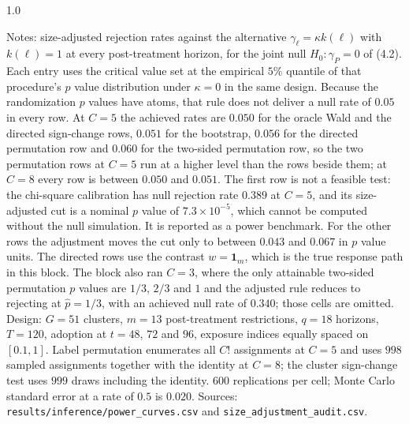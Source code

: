 \documentclass[12pt]{article}
\theoremstyle{definition}
\numberwithin{equation}{section}
\begin{document}
\begin{table}[htbp]
\begin{spacing}{1.0}
\smallskip
\begin{minipage}{0.95\textwidth}
\footnotesize Notes: size-adjusted rejection rates against the alternative
$\gamma_\ell = \kappa k(\ell)$ with $k(\ell) = 1$ at every post-treatment horizon, for the joint null $H_0: \gamma_P = 0$ of (4.2). Each entry
uses the critical value set at the empirical $5\%$ quantile of that
procedure's $p$ value distribution under $\kappa = 0$ in the same design.
Because the randomization $p$ values have atoms, that rule does not deliver a
null rate of $0.05$ in every row. At $C = 5$ the achieved rates are $0.050$
for the oracle Wald and the directed sign-change rows, $0.051$ for the
bootstrap, $0.056$ for the directed permutation row and $0.060$ for the
two-sided permutation row, so the two permutation rows at $C = 5$ run at a
higher level than the rows beside them; at $C = 8$ every row is between
$0.050$ and $0.051$. The first row is not a feasible test: the chi-square calibration has null rejection rate $0.389$ at $C = 5$, and its size-adjusted cut is a nominal $p$ value of $7.3 \times 10^{-5}$, which cannot be computed
without the null simulation. It is reported as a power benchmark. For the
other rows the adjustment moves the cut only to between $0.043$ and $0.067$ in
$p$ value units. The directed rows use the contrast $w = \mathbf{1}_m$, which
is the true response path in this block. The block also ran $C = 3$, where the
only attainable two-sided permutation $p$ values are $1/3$, $2/3$ and $1$ and
the adjusted rule reduces to rejecting at $\hat{p} = 1/3$, with an achieved
null rate of $0.340$; those cells are omitted. Design: $G = 51$ clusters,
$m = 13$ post-treatment restrictions, $q = 18$ horizons, $T = 120$, adoption at
$t = 48$, $72$ and $96$, exposure indices equally spaced on $[0.1,1]$. Label
permutation enumerates all $C!$ assignments at $C = 5$ and uses $998$ sampled
assignments together with the identity at $C = 8$; the cluster sign-change test uses $999$ draws including the identity. $600$ replications per cell;
Monte Carlo standard error at a rate of $0.5$ is $0.020$. Sources:
\texttt{results/inference/power\_curves.csv} and
\texttt{size\_adjustment\_audit.csv}.
\end{minipage}
\end{spacing}
\end{table}
\end{document}
